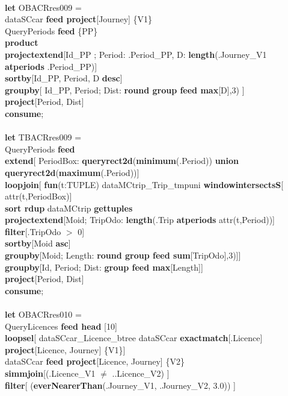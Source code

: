 \documentclass[a4paper]{article}
\newcommand{\op}[1]{\textbf{#1}}
\begin{document}
\begin{scriptsize}
\begin{tabbing}
\\
\op{let} OBACRres009 =\\
\>dataSCcar \op{feed project}[Journey] \{V1\}\\
\>QueryPeriods \op{feed} \{PP\}\\
\>\op{product}\\
\>\op{projectextend}[Id\_PP ; Period: .Period\_PP, D: \op{length}(.Journey\_V1 \op{atperiods} .Period\_PP)]\\
\>\op{sortby}[Id\_PP, Period, D \op{desc}]\\
\>\op{groupby}[ Id\_PP, Period; Dist: \op{round group feed max}[D],3) ]\\
\>\op{project}[Period, Dist]\\
\op{consume};\\
\\
\op{let} TBACRres009 =\\
\>QueryPeriods \op{feed}\\
\>\op{extend}[ PeriodBox: \op{queryrect2d}(\op{minimum}(.Period)) \op{union queryrect2d}(\op{maximum}(.Period))]\\
\>\op{loopjoin}[ \op{fun}(t:TUPLE) dataMCtrip\_Trip\_tmpuni \op{windowintersectsS}[ attr(t,PeriodBox)]\\
\>\>\op{sort rdup} dataMCtrip \op{gettuples}\\
\>\>\op{projectextend}[Moid; TripOdo: \op{length}(.Trip \op{atperiods} attr(t,Period))]\\
\>\>\op{filter}[.TripOdo $>$ 0]\\
\>\>\op{sortby}[Moid \op{asc}]\\
\>\>\op{groupby}[Moid; Length: \op{round group feed sum}[TripOdo],3)]]\\
\>\op{groupby}[Id, Period; Dist: \op{group feed max}[Length]]\\
\>\op{project}[Period, Dist]\\
\op{consume};\\
\\
\op{let} OBACRres010 =\\
\>QueryLicences \op{feed head} [10]\\
\>\>\op{loopsel}[ dataSCcar\_Licence\_btree dataSCcar \op{exactmatch}[.Licence]\\
\>\>\>\op{project}[Licence, Journey] \{V1\}]\\
\>dataSCcar \op{feed project}[Licence, Journey] \{V2\}\\
\>\op{simmjoin}[(.Licence\_V1 $\neq$ ..Licence\_V2) ]\\
\>\op{filter}[ (\op{everNearerThan}(.Journey\_V1, .Journey\_V2, 3.0)) ]\\

\end{tabbing}
\end{scriptsize}
\end{document}
